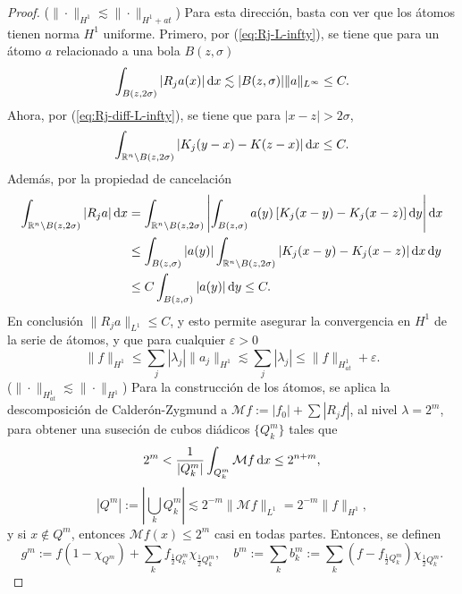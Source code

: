 \begin{proof}
	($\|\cdot\|_{H^1} \lesssim \|\cdot\|_{H^1+{at}}$) Para esta dirección, basta con ver que los átomos tienen norma $H^1$ uniforme. Primero, por (\ref{eq:Rj-L-infty}), se tiene que para un átomo $a$ relacionado a una bola $B(z, \sigma)$
	\begin{equation*}
		\int_{B(z, 2\sigma)}|R_j a(x) |\mathop{}\!\mathrm{d} x \lesssim |B(z, \sigma)|\|a\|_{L^\infty} \leq C.
	\end{equation*}
	Ahora, por (\ref{eq:Rj-diff-L-infty}), se tiene que para $|x-z|>2\sigma$, 
	\begin{equation*}
		\int_{\mathbb{R}^n\setminus B(z, 2\sigma)} |K_j(y-x) - K(z-x)|\mathop{}\!\mathrm{d} x \leq C.
	\end{equation*}
	Además, por la propiedad de cancelación
	\begin{align*}
		\int_{\mathbb{R}^n\setminus B(z, 2\sigma)} |R_ja|\mathop{}\!\mathrm{d} x & = \int_{\mathbb{R}^n\setminus B(z, 2\sigma)} \left| \int_{B(z, \sigma)} a(y)  \left[ K_j(x - y)- K_j(x - z) \right] \mathop{}\!\mathrm{d} y
		\right| \mathop{}\!\mathrm{d} x \\
		& \leq  \int_{B(z, \sigma)}|a(y)| \int_{\mathbb{R}^n\setminus B(z, 2\sigma)} |K_j(x - y)- K_j(x - z)| \mathop{}\!\mathrm{d} x \mathop{}\!\mathrm{d} y \\
		& \leq C \int_{B(z, \sigma)}|a(y)| \mathop{}\!\mathrm{d} y \leq C.
	\end{align*}
	En conclusión $\|R_j a\|_{L^1} \leq C$, y esto permite asegurar la convergencia en $H^1$ de la serie de átomos, y que  para cualquier $\varepsilon>0$
	\begin{equation*}
		\|f\|_{H^1}  \leq \sum_j |\lambda_j| \|a_j\|_{H^1} \lesssim \sum_j |\lambda_j| \leq \|f\|_{H^1_{at}} + \varepsilon.
	\end{equation*}
	($\|\cdot\|_{H^1_{at}}\lesssim \|\cdot\|_{H^1}$) Para la construcción de los átomos,  se aplica la descomposición de Calderón-Zygmund a $\mathcal{M}f:= |f_0| + \sum |R_jf|$, al nivel $\lambda=2^m$, para obtener una suseción de cubos diádicos $\{Q_k^m\}$ tales que 
	\begin{equation*}
		2^m < \frac{1}{|Q_k^m|}\int_{Q_k^m} \mathcal{M}f\mathop{}\!\mathrm{d} x \leq 2^{n+m},
	\end{equation*}
	\begin{equation*}
		|Q^m| := \left|\bigcup_k Q_k^m\right| \lesssim 2^{-m}\|\mathcal{M}f\| _{L^1}= 2^{-m}\|f\|_{H^1},
	\end{equation*}
	y si $x\notin Q^m$, entonces $\mathcal{M}f(x) \leq 2^m$ casi en todas partes. Entonces, se definen 
	\begin{equation*}
		g^m := f(1-\chi_{Q^m}) + \sum_k f_{\frac{1}{2}Q_k^m}\chi_{\frac{1}{2}Q_k^m}, \quad b^m := \sum_k b_k^m := \sum_k (f-f_{\frac{1}{2}Q_k^m})\chi_{\frac{1}{2}Q_k^m}.

\end{equation*}
\end{proof}
